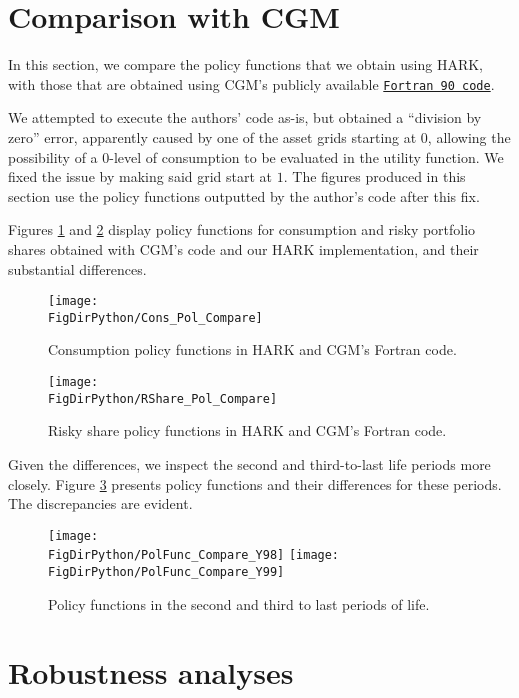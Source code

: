 \documentclass[../CGMPort.tex]{subfiles}
\begin{document}
\section{Comparison with CGM}\label{sec:Comparison}

In this section, we compare the policy functions that we obtain using HARK, with those that are obtained using CGM's publicly available 
\href{http://faculty.london.edu/fgomes/cgmcode.ZIP}{\texttt{Fortran 90 code}}.

We attempted to execute the authors' code as-is, but obtained a ``division by zero'' error, apparently caused by one of the asset grids starting at $0$,
allowing the possibility of a $0$-level of consumption to be evaluated in the
utility function. We fixed the issue by making said grid start at $1$. The
figures produced in this section use the policy functions outputted by the
author's code after this fix. 

Figures \ref{fig:heatmapCons} and \ref{fig:heatmapRshare} display policy 
functions for consumption and risky portfolio shares obtained with CGM's code and our HARK implementation, and their substantial differences.

\begin{figure}[h]
	\texttt{[image: \\FigDirPython/Cons\_Pol\_Compare]}
	\caption{Consumption policy functions in HARK and CGM's Fortran 
	code.}\label{fig:heatmapCons}
\end{figure}

\begin{figure}[h]
	\texttt{[image: \\FigDirPython/RShare\_Pol\_Compare]}
	\caption{Risky share policy functions in HARK and CGM's Fortran code.}
	\label{fig:heatmapRshare}
\end{figure}

Given the differences, we inspect the second and third-to-last life periods more closely. Figure \ref{fig:pol_funcs_last} presents policy functions and their differences for these periods. The discrepancies are evident.

\begin{figure}[h]
	\texttt{[image: \\FigDirPython/PolFunc\_Compare\_Y98]}
	\texttt{[image: \\FigDirPython/PolFunc\_Compare\_Y99]}
	\caption{Policy functions in the second and third to last periods of life.}
	\label{fig:pol_funcs_last}
\end{figure}


\section{Robustness analyses}\label{sec:Sensitivity}
\end{document}
